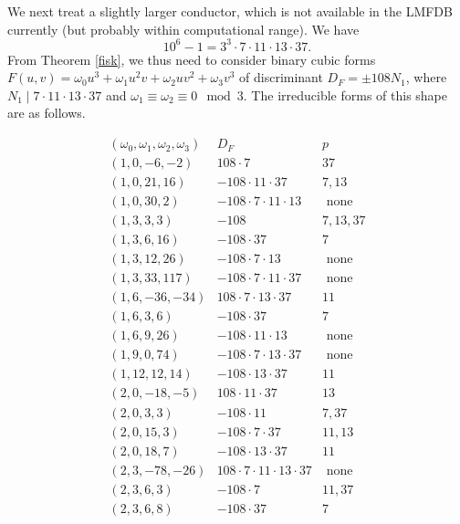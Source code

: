 We next treat a slightly larger conductor, which is not available in the LMFDB currently (but probably within computational range).
We have 
$$
10^6-1 = 3^3 \cdot 7 \cdot 11 \cdot 13 \cdot 37.
$$
From Theorem \ref{fisk}, we thus need to consider binary cubic forms $F(u,v) =  \omega_0 u^3 + \omega_1 u^2v + \omega_2 uv^2 + \omega_3 v^3$ of discriminant $D_F = \pm 108 N_1$, where $N_1 \mid 7 \cdot 11 \cdot 13 \cdot 37$ and $\omega_1 \equiv \omega_2 \equiv 0 \mod{3}$. The irreducible forms of this shape are as follows.

$$
\begin{array}{ccc} 
(\omega_0,\omega_1,\omega_2,\omega_3) & D_F & p \\ \hline
(1,0,-6,-2) & 108 \cdot 7 & 37 \\
(1,0,21,16) & -108 \cdot 11 \cdot 37 & 7, 13 \\
(1,0,30,2) & -108 \cdot 7 \cdot 11 \cdot 13 & \mbox{ none } \\
(1, 3, 3, 3) & -108 & 7, 13, 37  \\
(1, 3, 6, 16) & -108 \cdot 37 & 7 \\
(1,3,12,26) & -108 \cdot 7 \cdot 13 & \mbox{ none } \\
(1,3,33,117) & -108 \cdot 7 \cdot 11 \cdot 37 & \mbox{ none }  \\ 
(1,6,-36,-34) & 108 \cdot 7 \cdot 13 \cdot 37 & 11 \\
(1,6,3,6) & -108 \cdot 37 & 7 \\
(1,6,9,26) & -108 \cdot 11 \cdot 13 & \mbox{ none } \\
(1,9,0,74) & -108 \cdot 7 \cdot 13 \cdot 37 & \mbox{ none } \\
(1,12,12,14) & -108 \cdot 13 \cdot 37 & 11  \\
(2, 0, -18, -5) & 108 \cdot 11 \cdot 37 & 13  \\
(2,0,3,3) & -108 \cdot 11 & 7, 37   \\
(2,0,15,3) & -108 \cdot 7 \cdot 37 & 11, 13 \\
(2,0,18,7) & -108 \cdot 13 \cdot 37 & 11 \\
 (2,3,-78,-26) & 108 \cdot 7 \cdot 11 \cdot 13 \cdot 37 & \mbox{ none }\\
(2,3,6,3) & -108 \cdot 7 & 11, 37\\
  (2,3,6,8) & -108 \cdot 37 & 7 \\

\end{array}$$
